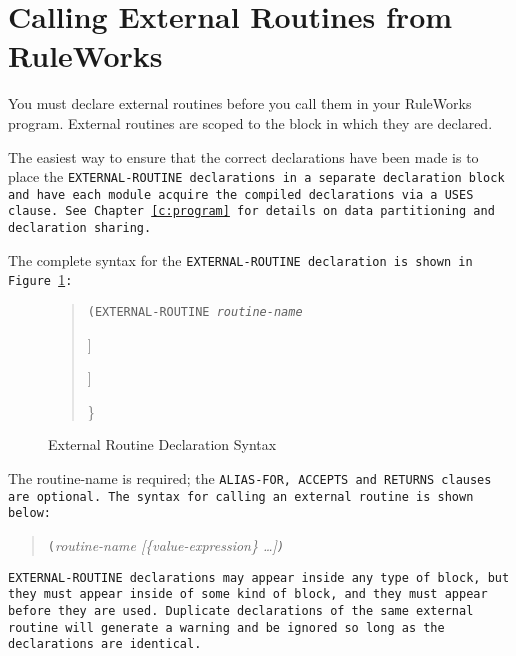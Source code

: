 \section{Calling External Routines from RuleWorks}

You must declare external routines before you call them in your
RuleWorks program.  External routines are scoped to the block in which
they are declared.

The easiest way to ensure that the correct declarations have been made
is to place the \tt{EXTERNAL-ROUTINE} declarations in a separate
declaration block and have each module acquire the compiled
declarations via a \tt{USES} clause. See Chapter~\ref{c:program} for
details on data partitioning and declaration sharing.

The complete syntax for the \tt{EXTERNAL-ROUTINE} declaration is shown
in Figure~\ref{f:6-1}:

\begin{figure}[h]
\begin{quote}
\tt{(EXTERNAL-ROUTINE} \it{routine-name}\par
{}\par
\qquad\qquad[\verb|<|\it{formal-parameter-name}\verb|>| [\it{size}]]\par
{}\par
\qquad{}\par
\qquad\qquad[\verb|<|\it{formal-parameter-name}\verb|>| [\it{size}]]\par
{}\}\par
\qquad{}\par
\end{quote}
\caption{External Routine Declaration Syntax}
\label{f:6-1}
\end{figure}

The routine-name is required; the \tt{ALIAS-FOR}, \tt{ACCEPTS} and
\tt{RETURNS} clauses are optional.  The syntax for calling an external
routine is shown below:

\begin{quote}
\verb|(|\it{routine-name} [\{\it{value-expression}\} \ldots]\verb|)|
\end{quote}

\tt{EXTERNAL-ROUTINE} declarations may appear inside any type of block, but
they must appear inside of some kind of block, and they must appear
before they are used. Duplicate declarations of the same external
routine will generate a warning and be ignored so long as the
declarations are identical.

